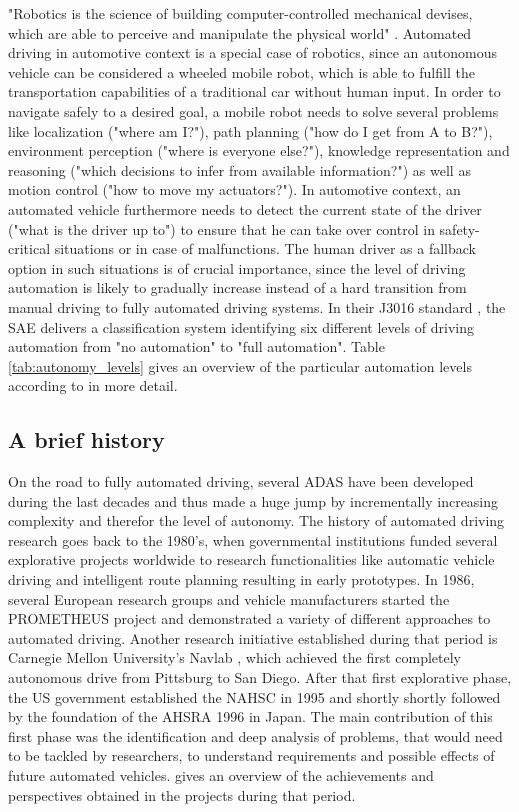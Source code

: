 "Robotics is the science of building computer-controlled mechanical devises, which are able to perceive and manipulate the physical world" \cite{Thrun2005}.
Automated driving in automotive context is a special case of robotics, since an autonomous vehicle can be considered a wheeled mobile robot, which is able to fulfill the transportation capabilities of a traditional car without human input.
In order to navigate safely to a desired goal, a mobile robot needs to solve several problems like localization ("where am I?"), path planning ("how do I get from A to B?"), environment perception ("where is everyone else?"), knowledge representation and reasoning ("which decisions to infer from available information?") as well as motion control ("how to move my actuators?").
In automotive context, an automated vehicle furthermore needs to detect the current state of the driver ("what is the driver up to") to ensure that he can take over control in safety-critical situations or in case of malfunctions.
The human driver as a fallback option in such situations is of crucial importance, since the level of driving automation is likely to gradually increase instead of a hard transition from manual driving to fully automated driving systems.
In their J3016 standard \cite{SAE_J3016}, the \ac{SAE} delivers a classification system identifying six different levels of driving automation from "no automation" to "full automation".
Table \ref{tab:autonomy_levels} gives an overview of the particular automation levels according to \cite{SAE_J3016} in more detail.

\subsection{A brief history}
\label{subsec:aut_driving_hist}

On the road to fully automated driving, several \ac{ADAS} have been developed during the last decades and thus made a huge jump by incrementally increasing complexity and therefor the level of autonomy.
The history of automated driving research goes back to the 1980's, when governmental institutions funded several explorative projects worldwide to research functionalities like automatic vehicle driving and intelligent route planning resulting in early prototypes.
In 1986, several European research groups and vehicle manufacturers started the \ac{PROMETHEUS} project \cite{Dickmanns1990} and demonstrated a variety of different approaches to automated driving.
Another research initiative established during that period is Carnegie Mellon University's Navlab \cite{Thorpe1988}, which achieved the first completely autonomous drive from Pittsburg to San Diego.
After that first explorative phase, the US government established the \ac{NAHSC} in 1995 and shortly shortly followed by the foundation of the \ac{AHSRA} 1996 in Japan.
The main contribution of this first phase was the identification and deep analysis of problems, that would need to be tackled by researchers, to understand requirements and possible effects of future automated vehicles.
\cite{Bertozzi2000} gives an overview of the achievements and perspectives obtained in the projects during that period.

